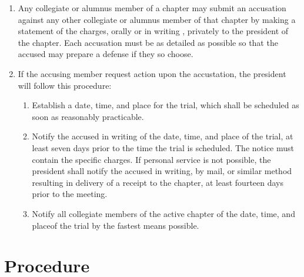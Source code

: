 	\begin{enumerate}
		\item Any collegiate or alumnus member of a chapter may submit an accusation against any other collegiate or alumnus member of that chapter by making a statement of the charges, orally or in writing , privately to the president of the chapter. Each accusation must be as detailed as possible so that the accused may prepare a defense if they so choose.
		\item If the accusing member request action upon the accustation, the president will follow this procedure:
			\begin{enumerate}
				\item Establish a date, time, and place for the trial, which shall be scheduled as soon as reasonably practicable.
				\item Notify the accused in writing of the date, time, and place of the trial, at least seven days prior to the time the trial is scheduled. The notice must contain the specific charges. If personal service is not possible, the president shall notify the accused in writing, by mail, or similar method resulting in delivery of a receipt to the chapter, at least fourteen days prior to the meeting.
				\item Notify all collegiate members of the active chapter of the date, time, and placeof the trial by the fastest means possible.
			\end{enumerate}

	\end{enumerate}

\section{Procedure}

